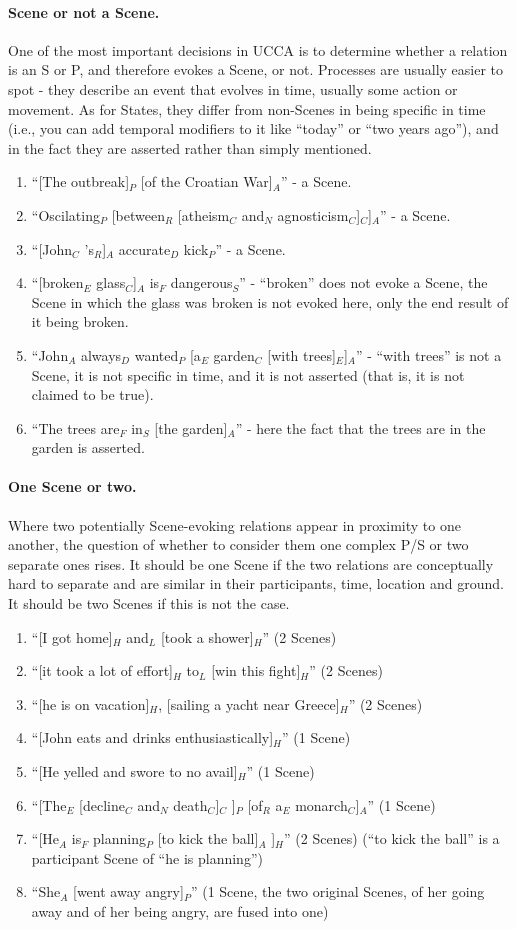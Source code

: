 \documentclass[11pt]{article}
\newcommand{\be}{\begin{enumerate}}
\newcommand{\ee}{\end{enumerate}}
\begin{document}
\paragraph{Scene or not a Scene.} One of the most important decisions in UCCA is to determine whether a relation is an S or P, and therefore evokes a Scene, or not. Processes are usually easier to spot - they describe an event that evolves in time, usually some action or movement. As for States, they differ from non-Scenes in being specific in time (i.e., you can add temporal modifiers to it like ``today'' or ``two years ago''), and in the fact they are asserted rather than simply mentioned.
\be
\item
``[The outbreak]$_P$ [of the Croatian War]$_A$'' - a Scene.
\item
``Oscilating$_P$ [between$_R$ [atheism$_C$ and$_N$ agnosticism$_C$]$_C$]$_A$'' - a Scene.
\item
``[John$_C$ 's$_R$]$_A$ accurate$_D$ kick$_P$'' - a Scene.
\item
``[broken$_E$ glass$_C$]$_A$ is$_F$ dangerous$_S$'' - ``broken'' does not evoke a Scene, the Scene in which the glass was broken is not evoked here, only the end result of it being broken.
\item
``John$_A$ always$_D$ wanted$_P$ [a$_E$ garden$_C$ [with trees]$_E$]$_A$'' - ``with trees'' is not a Scene, it is not specific in time, and it is not asserted (that is, it is not claimed to be true).
\item
``The trees are$_F$ in$_S$ [the garden]$_A$'' - here the fact that the trees are in the garden is asserted.
\ee

\paragraph{One Scene or two.} Where two potentially Scene-evoking relations appear in proximity to one another, the question of whether to consider them one complex P/S or two separate ones rises. It should be one Scene if the two relations are conceptually hard to separate and are similar in their participants, time, location and ground. It should be two Scenes if this is not the case.
\be
\item
``[I got home]$_H$ and$_L$ [took a shower]$_H$'' (2 Scenes)
\item
``[it took a lot of effort]$_H$ to$_L$ [win this fight]$_H$'' (2 Scenes)
\item
``[he is on vacation]$_H$, [sailing a yacht near Greece]$_H$'' (2 Scenes)
\item
``[John eats and drinks enthusiastically]$_H$'' (1 Scene)
\item
``[He yelled and swore to no avail]$_H$'' (1 Scene)
\item
``[The$_E$ [decline$_C$ and$_N$ death$_C$]$_C$ ]$_P$ [of$_R$ a$_E$ monarch$_C$]$_A$'' (1 Scene)
\item
``[He$_A$ is$_F$ planning$_P$ [to kick the ball]$_A$ ]$_H$'' (2 Scenes) (``to kick the ball'' is a participant Scene of ``he is planning'')
\item
``She$_A$ [went away angry]$_P$'' (1 Scene, the two original Scenes, of her going away and of her being angry, are fused into one)
\ee
\end{document}

